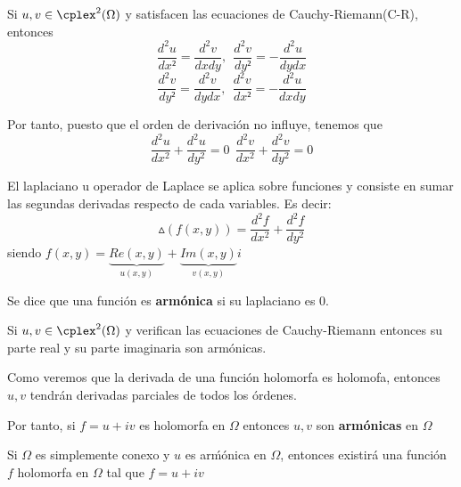 \documentclass{apuntes}
\begin{document}
Si $u,v\in \cplex^2(\Omega)$ y satisfacen las ecuaciones de Cauchy-Riemann(C-R), entonces
\[\frac{d^2u}{dx²}=\frac{d^2v}{dxdy}, \ \ \frac{d^2v}{dy²}=-\frac{d^2u}{dydx}\]
\[\frac{d^2v}{dy²}=\frac{d^2v}{dydx}, \ \ \frac{d^2v}{dx²}=-\frac{d^2u}{dxdy}\]

Por tanto, puesto que el orden de derivación no influye, tenemos que
\[\frac{d^2u}{dx^2}+\frac{d^2u}{dy^2} = 0 \ \ \frac{d^2v}{dx^2}+\frac{d^2v}{dy^2} = 0\]

\begin{defn}[Laplaciano]
El laplaciano u operador de Laplace se aplica sobre funciones y consiste en sumar las segundas derivadas respecto de cada variables. Es decir:
\[\vartriangle (f(x,y)) = \frac{d^2f}{dx^2}+\frac{d^2f}{dy^2}\]
siendo $f(x,y)=\underbrace{Re(x,y)}_{u(x,y)}+\underbrace{Im(x,y)}_{v(x,y)}i$
\end{defn}

\begin{defn}
Se dice que una función es \textbf{armónica} si su laplaciano es 0.
\end{defn}

\begin{prop}
Si $u,v \in \cplex^2(\Omega)$ y verifican las ecuaciones de Cauchy-Riemann entonces su parte real y su parte imaginaria son armónicas.
\end{prop}

Como veremos que la derivada de una función holomorfa es holomofa, entonces $u,v$ tendrán derivadas parciales de todos los órdenes.

Por tanto, si $f=u+iv$ es holomorfa en $\Omega$ entonces $u,v$ son \textbf{armónicas} en $\Omega$

\obs Si $\Omega$ es simplemente conexo y $u$ es arḿónica en $\Omega$, entonces existirá una función $f$ holomorfa en $\Omega$ tal que $f=u+iv$
\end{document}
